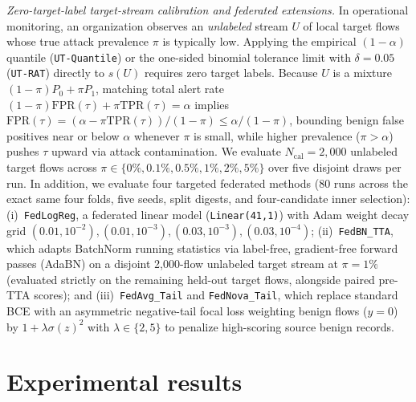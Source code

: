 \documentclass[journal,10pt]{IEEEtran}
\newcommand{\tp}{\mathrm{TPR}}
\newcommand{\fpr}{\mathrm{FPR}}
\begin{document}
\emph{Zero-target-label target-stream calibration and federated extensions.} In operational monitoring, an organization observes an \emph{unlabeled} stream $U$ of local target flows whose true attack prevalence $\pi$ is typically low. Applying the empirical $(1-\alpha)$ quantile (\texttt{UT-Quantile}) or the one-sided binomial tolerance limit with $\delta=0.05$ (\texttt{UT-RAT}) directly to $s(U)$ requires zero target labels. Because $U$ is a mixture $(1-\pi)P_0+\pi P_1$, matching total alert rate $(1-\pi)\fpr(\tau)+\pi\tp(\tau)=\alpha$ implies $\fpr(\tau)=(\alpha-\pi\tp(\tau))/(1-\pi)\le\alpha/(1-\pi)$, bounding benign false positives near or below $\alpha$ whenever $\pi$ is small, while higher prevalence ($\pi>\alpha$) pushes $\tau$ upward via attack contamination. We evaluate $N_{\mathrm{cal}}=2{,}000$ unlabeled target flows across $\pi\in\{0\%,0.1\%,0.5\%,1\%,2\%,5\%\}$ over five disjoint draws per run. In addition, we evaluate four targeted federated methods (80 runs across the exact same four folds, five seeds, split digests, and four-candidate inner selection): (i)~\texttt{FedLogReg}, a federated linear model (\texttt{Linear(41,1)}) with Adam weight decay grid $(0.01,10^{-2}),(0.01,10^{-3}),(0.03,10^{-3}),(0.03,10^{-4})$; (ii)~\texttt{FedBN\_TTA}, which adapts BatchNorm running statistics via label-free, gradient-free forward passes (AdaBN) on a disjoint 2,000-flow unlabeled target stream at $\pi=1\%$ (evaluated strictly on the remaining held-out target flows, alongside paired pre-TTA scores); and (iii)~\texttt{FedAvg\_Tail} and \texttt{FedNova\_Tail}, which replace standard BCE with an asymmetric negative-tail focal loss weighting benign flows ($y=0$) by $1+\lambda\sigma(z)^2$ with $\lambda\in\{2,5\}$ to penalize high-scoring source benign records.

\section{Experimental results}
\end{document}

